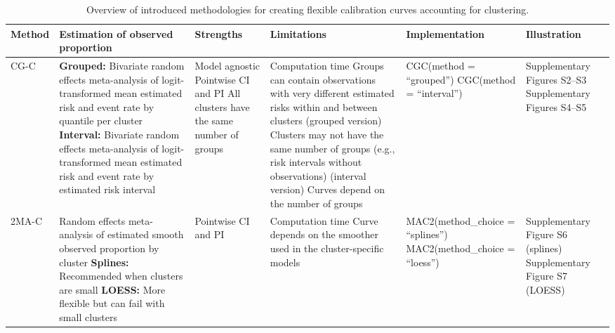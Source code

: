 \begin{table}
\centering
\small
\begin{threeparttable}
\caption[Overview introduced methods]{Overview of introduced methodologies for creating flexible calibration curves accounting for clustering.}
\label{tab:4:1}
\begin{tabularx}{\linewidth}{l >{\raggedright\arraybackslash}X >{\raggedright\arraybackslash}X >{\raggedright\arraybackslash}X >{\raggedright\arraybackslash}X >{\raggedright\arraybackslash}X}
\toprule
\textbf{Method} & \textbf{Estimation of observed proportion} & \textbf{Strengths} & \textbf{Limitations} & \textbf{Implementation} & \textbf{Illustration} \\
\midrule
CG-C & \textbf{Grouped:} Bivariate random effects meta-analysis of logit-transformed mean estimated risk and event rate by quantile per cluster \newline \textbf{Interval:} Bivariate random effects meta-analysis of logit-transformed mean estimated risk and event rate by estimated risk interval & Model agnostic \newline Pointwise CI and PI \newline All clusters have the same number of groups & Computation time \newline Groups can contain observations with very different estimated risks within and between clusters (grouped version) \newline Clusters may not have the same number of groups (e.g., risk intervals without observations) (interval version) \newline Curves depend on the number of groups & CGC(method = ``grouped'') \newline CGC(method = ``interval'') & Supplementary Figures S2--S3 \newline Supplementary Figures S4--S5 \\
\addlinespace
2MA-C & Random effects meta-analysis of estimated smooth observed proportion by cluster \newline \textbf{Splines:} Recommended when clusters are small \newline \textbf{LOESS:} More flexible but can fail with small clusters & Pointwise CI and PI & Computation time \newline Curve depends on the smoother used in the cluster-specific models & MAC2(method\_choice = ``splines'') \newline MAC2(method\_choice = ``loess'') & Supplementary Figure S6 (splines) \newline Supplementary Figure S7 (LOESS) \\

\end{tabularx}
\end{threeparttable}
\end{table}
